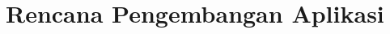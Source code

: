 \documentclass[Rizilab.tex]{subfile}
\begin{document}
  \section{Rencana Pengembangan Aplikasi}
\end{document}
